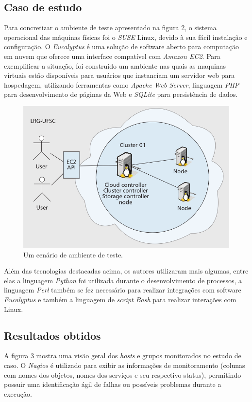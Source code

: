 \documentclass[12pt]{article}
\begin{document}
\subsection{Caso de estudo}
Para concretizar o ambiente de teste apresentado na figura 2, o sistema operacional das máquinas físicas foi o \emph{SUSE} Linux, devido à sua fácil instalação e configuração. O \emph{Eucalyptus} é uma solução de software aberto para computação em nuvem que oferece uma interface compatível com \emph{Amazon EC2}. Para exemplificar a situação, foi construído um ambiente nas quais as maquinas virtuais estão disponíveis para usuários que instanciam um servidor web para hospedagem, utilizando ferramentas como \emph{Apache Web Server}, linguagem \emph{PHP} para desenvolvimento de páginas da Web e \emph{SQLite} para persistência de dados.

\begin{figure}[H]
    \includegraphics[width=\linewidth]{ambiente_teste.png}
    \caption{Um cenário de ambiente de teste.}
\end{figure}

Além das tecnologias destacadas acima, os autores utilizaram mais algumas, entre elas a linguagem \emph{Python} foi utilizada durante o desenvolvimento de processos, a linguagem \emph{Perl} também se fez necessário para realizar integrações com software \emph{Eucalyptus} e também a linguagem de \emph{script Bash} para realizar interações com Linux.

\subsection{Resultados obtidos}
A figura 3 mostra uma visão geral dos \emph{hosts} e grupos monitorados no estudo de caso. O \emph{Nagios} é utilizado para exibir as informações de monitoramento (colunas com nomes dos objetos, nomes dos serviços e seu respectivo status), permitindo possuir uma identificação ágil de falhas ou possíveis problemas durante a execução.
\end{document}
